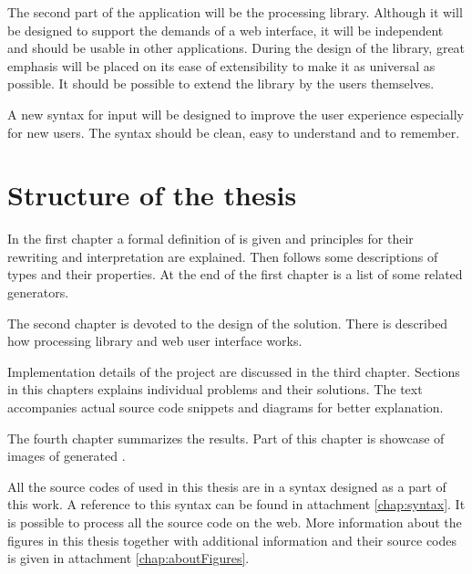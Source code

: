 The second part of the application will be the \lsystem processing library.
Although it will be designed to support the demands of a web interface, it will be independent and should be usable in other applications.
During the design of the library, great emphasis will be placed on its ease of extensibility to make it as universal as possible.
It should be possible to extend the library by the users themselves.

A new syntax for input will be designed to improve the user experience especially for new users.
The syntax should be clean, easy to understand and to remember.


\section*{Structure of the thesis}

In the first chapter a formal definition of \lsystems is given and principles for their rewriting and interpretation are explained.
Then follows some descriptions of \lsystem types and their properties.
At the end of the first chapter is a list of some related \lsystem generators.

The second chapter is devoted to the design of the solution.
There is described how \lsystem processing library and web user interface works.

Implementation details of the project are discussed in the third chapter.
Sections in this chapters explains individual problems and their solutions.
The text accompanies actual source code snippets and diagrams for better explanation.

The fourth chapter summarizes the results.
Part of this chapter is showcase of images of generated \lsystems.

All the source codes of \lsystems used in this thesis are in a syntax designed as a part of this work.
A reference to this syntax can be found in attachment \ref{chap:syntax}.
It is possible to process all the source code on the web.
More information about the figures in this thesis together with additional information and their source codes is given in attachment \ref{chap:aboutFigures}.































